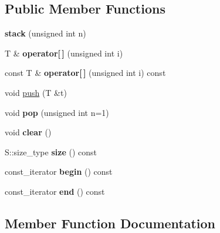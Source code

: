\subsection*{Public Member Functions}
\begin{DoxyCompactItemize}
\item 
\mbox{\label{classyy_1_1stack_af4277ae80177abc36f242c3646cbcfbe}} 
{\bfseries stack} (unsigned int n)
\item 
\mbox{\label{classyy_1_1stack_a1058b8b7e1a3e0aa7b1e6f2f1a62c234}} 
T \& {\bfseries operator\mbox{[}$\,$\mbox{]}} (unsigned int i)
\item 
\mbox{\label{classyy_1_1stack_a248d8971564c62112266438ae86e53d5}} 
const T \& {\bfseries operator\mbox{[}$\,$\mbox{]}} (unsigned int i) const
\item 
void \hyperlink{classyy_1_1stack_acf2b971ffb94c77b56fc0249b55250fa}{push} (T \&t)
\item 
\mbox{\label{classyy_1_1stack_a0800c0a796cade80c3ce9a785dc87564}} 
void {\bfseries pop} (unsigned int n=1)
\item 
\mbox{\label{classyy_1_1stack_ae8b2c8309dcdef98210205b1c96b2238}} 
void {\bfseries clear} ()
\item 
\mbox{\label{classyy_1_1stack_adff918ad84f227bd3d51eb8ef5c1dc95}} 
S\+::size\+\_\+type {\bfseries size} () const
\item 
\mbox{\label{classyy_1_1stack_ab7f28676a74b21114422d94d10b971a7}} 
const\+\_\+iterator {\bfseries begin} () const
\item 
\mbox{\label{classyy_1_1stack_a7d5b4e82ede55ba095de45da26600a8c}} 
const\+\_\+iterator {\bfseries end} () const
\end{DoxyCompactItemize}


\subsection{Member Function Documentation}
\mbox{\label{classyy_1_1stack_acf2b971ffb94c77b56fc0249b55250fa}} 
